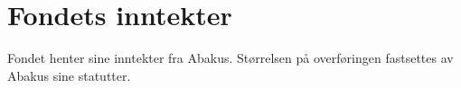 \section{Fondets inntekter}
Fondet henter sine inntekter fra Abakus. Størrelsen
på overføringen fastsettes av Abakus 
sine statutter. 
